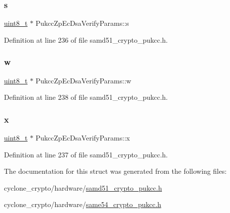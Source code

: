 \subsubsection{\texorpdfstring{s}{s}}
{\footnotesize\ttfamily \hyperlink{stdint_8h_aba7bc1797add20fe3efdf37ced1182c5}{uint8\+\_\+t} $\ast$ Pukcc\+Zp\+Ec\+Dsa\+Verify\+Params\+::s}



Definition at line 236 of file samd51\+\_\+crypto\+\_\+pukcc.\+h.

\mbox{\label{structPukccZpEcDsaVerifyParams_a31f84c1a1e5b1918691c76eeda448dda}} 
\subsubsection{\texorpdfstring{w}{w}}
{\footnotesize\ttfamily \hyperlink{stdint_8h_aba7bc1797add20fe3efdf37ced1182c5}{uint8\+\_\+t} $\ast$ Pukcc\+Zp\+Ec\+Dsa\+Verify\+Params\+::w}



Definition at line 238 of file samd51\+\_\+crypto\+\_\+pukcc.\+h.

\mbox{\label{structPukccZpEcDsaVerifyParams_a7ade27e4f2d94397ec5b80f91eaa7854}} 
\subsubsection{\texorpdfstring{x}{x}}
{\footnotesize\ttfamily \hyperlink{stdint_8h_aba7bc1797add20fe3efdf37ced1182c5}{uint8\+\_\+t} $\ast$ Pukcc\+Zp\+Ec\+Dsa\+Verify\+Params\+::x}



Definition at line 237 of file samd51\+\_\+crypto\+\_\+pukcc.\+h.



The documentation for this struct was generated from the following files\+:\begin{DoxyCompactItemize}
\item 
cyclone\+\_\+crypto/hardware/\hyperlink{samd51__crypto__pukcc_8h}{samd51\+\_\+crypto\+\_\+pukcc.\+h}\item 
cyclone\+\_\+crypto/hardware/\hyperlink{same54__crypto__pukcc_8h}{same54\+\_\+crypto\+\_\+pukcc.\+h}\end{DoxyCompactItemize}

